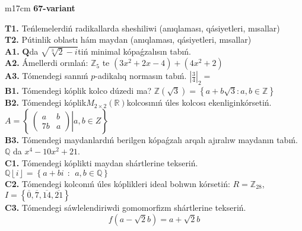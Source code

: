 \documentclass{article}
\begin{document}
\begin{tabular}{m{17cm}}
\textbf{67-variant}
\newline

\textbf{T1.} Teńlemelerdiń radikallarda sheshiliwi (anıqlaması, qásiyetleri, mısallar) \\
\textbf{T2.} Pútinlik oblastı hám maydan (anıqlaması, qásiyetleri, mısallar) \\
\textbf{A1.} \(\mathbf{Q}\)da \(\sqrt{\sqrt[3]{2} - i}\)tiń minimal kópaǵzalısın tabıń. \\
\textbf{A2.} Ámellerdi orınlań: \(\mathbb{Z}_{5}\) te \(\left( 3x^{2} + 2x - 4 \right) + \left( 4x^{2} + 2 \right)\) \\
\textbf{A3.} Tómendegi sannıń \(p\)-adikalıq normasın tabıń. \(|\frac{3}{4}|_{2} =\) \\
\textbf{B1.} Tómendegi kóplik kolco dúzedi ma? \(\mathbb{Z}\left( \sqrt{3} \right) = \left\{ a + b\sqrt{3}:a,b \in \mathbb{Z} \right\}\) \\
\textbf{B2.} Tómendegi kóplik\(M_{2 \times 2}\left( \mathbb{R} \right)\)kolcosınıń úles kolcosı ekenliginkórsetiń. \(A = \left\{ \left. \ \begin{pmatrix}
a & b \\
7b & a
\end{pmatrix} \right|a,b \in Z \right\}\) \\
\textbf{B3.} Tómendegi maydanlardıń berilgen kópaǵzalı arqalı ajıralıw maydanın tabıń. \(\mathbb{Q}\) da \(x^{4} - 10x^{2} + 21\). \\
\textbf{C1.} Tómendegi kóplikti maydan shártlerine tekseriń. \(\mathbb{Q}\left\lfloor i \right\rfloor = \left\{ a + bi\ \ :\ \ a,b\mathbb{\in Q} \right\}\) \\
\textbf{C2.} Tómendegi kolconıń úles kóplikleri ideal bolıwın kórsetiń:
\(R = \mathbb{Z}_{28}\), \(I = \left\{ \overline{0},\overline{7},\overline{14},\overline{21} \right\}\) \\
\textbf{C3.} Tómendegi sáwlelendiriwdi gomomorfizm shártlerine tekseriń.
\[f\left( a - \sqrt{2}b \right) = a + \sqrt{2}b\] \\

\end{tabular}
\vspace{1cm}
\end{document}
